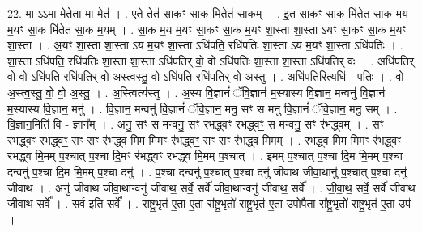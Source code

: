 \documentclass[17pt]{extarticle}
\begin{document}
22. मा ऽऽमा॒ मेते॒ता मा॒ मेत॑ । . एते॒ तेत॑ सा॒कꣳ सा॒क मि॒तेत॑ सा॒कम् । . इ॒त॒ सा॒कꣳ सा॒क मि॑तेत सा॒क म॒य म॒यꣳ सा॒क मि॑तेत सा॒क म॒यम् । . सा॒क म॒य म॒यꣳ सा॒कꣳ सा॒क म॒यꣳ शा॒स्ता शा॒स्ता ऽयꣳ सा॒कꣳ सा॒क म॒यꣳ शा॒स्ता । . अ॒यꣳ शा॒स्ता शा॒स्ता ऽय म॒यꣳ शा॒स्ता ऽधि॑पति॒ रधि॑पतिः शा॒स्ता ऽय म॒यꣳ शा॒स्ता ऽधि॑पतिः । . शा॒स्ता ऽधि॑पति॒ रधि॑पतिः शा॒स्ता शा॒स्ता ऽधि॑पतिर् वो॒ वो ऽधि॑पतिः शा॒स्ता शा॒स्ता ऽधि॑पतिर् वः । . अधि॑पतिर् वो॒ वो ऽधि॑पति॒ रधि॑पतिर् वो अस्त्वस्तु॒ वो ऽधि॑पति॒ रधि॑पतिर् वो अस्तु । . अधि॑पति॒रित्यधि॑ - प॒तिः॒ । . वो॒ अ॒स्त्व॒स्तु॒ वो॒ वो॒ अ॒स्तु॒ । . अ॒स्त्वित्य॑स्तु । . अ॒स्य वि॒ज्ञानं॑ ॅवि॒ज्ञान॑ म॒स्यास्य वि॒ज्ञान॒ मन्वनु॑ वि॒ज्ञान॑ म॒स्यास्य वि॒ज्ञान॒ मनु॑ । . वि॒ज्ञान॒ मन्वनु॑ वि॒ज्ञानं॑ ॅवि॒ज्ञान॒ मनु॒ सꣳ स मनु॑ वि॒ज्ञानं॑ ॅवि॒ज्ञान॒ मनु॒ सम् । . वि॒ज्ञान॒मिति॑ वि - ज्ञान᳚म् । . अनु॒ सꣳ स मन्वनु॒ सꣳ र॑भद्ध्वꣳ रभद्ध्वꣳ॒॒ स मन्वनु॒ सꣳ र॑भद्ध्वम् । . सꣳ र॑भद्ध्वꣳ रभद्ध्वꣳ॒॒ सꣳ सꣳ र॑भद्ध्व मि॒म मि॒मꣳ र॑भद्ध्वꣳ॒॒ सꣳ सꣳ र॑भद्ध्व मि॒मम् । . र॒भ॒द्ध्व॒ मि॒म मि॒मꣳ र॑भद्ध्वꣳ रभद्ध्व मि॒मम् प॒श्चात् प॒श्चा दि॒मꣳ र॑भद्ध्वꣳ रभद्ध्व मि॒मम् प॒श्चात् । . इ॒मम् प॒श्चात् प॒श्चा दि॒म मि॒मम् प॒श्चा दन्वनु॑ प॒श्चा दि॒म मि॒मम् प॒श्चा दनु॑ । . प॒श्चा दन्वनु॑ प॒श्चात् प॒श्चा दनु॑ जीवाथ जीवा॒थानु॑ प॒श्चात् प॒श्चा दनु॑ जीवाथ । . अनु॑ जीवाथ जीवा॒थान्वनु॑ जीवाथ॒ सर्वे॒ सर्वे॑ जीवा॒थान्वनु॑ जीवाथ॒ सर्वे᳚ । . जी॒वा॒थ॒ सर्वे॒ सर्वे॑ जीवाथ जीवाथ॒ सर्वे᳚ । . सर्व॒ इति॒ सर्वे᳚ । . रा॒ष्ट्र॒भृत॑ ए॒ता ए॒ता रा᳚ष्ट्र॒भृतो॑ राष्ट्र॒भृत॑ ए॒ता उपोपै॒ता रा᳚ष्ट्र॒भृतो॑ राष्ट्र॒भृत॑ ए॒ता उप॑ । \newline
\end{document}
